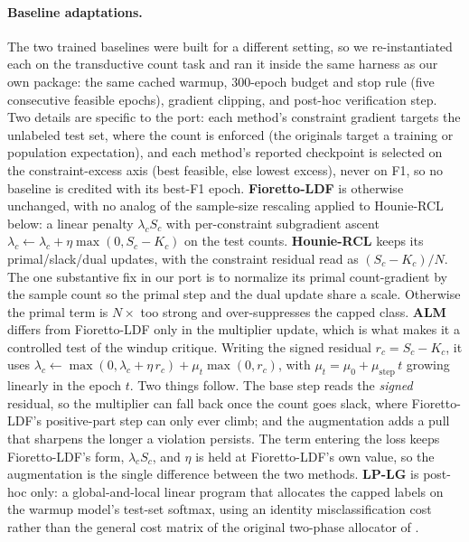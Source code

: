 \documentclass[10pt]{article}
\begin{document}
\paragraph{Baseline adaptations.}
The two trained baselines were built for a different setting, so we
re-instantiated each on the transductive count task and ran it inside the
same harness as our own package: the same cached warmup, $300$-epoch budget
and stop rule (five consecutive feasible epochs), gradient clipping, and
post-hoc verification step. Two details are specific to the port: each
method's constraint gradient targets the unlabeled test set, where the
count is enforced (the originals target a training or population
expectation), and each method's reported checkpoint is selected on the
constraint-excess axis (best feasible, else lowest excess), never on F1, so
no baseline is credited with its best-F1 epoch. \textbf{Fioretto-LDF} is
otherwise unchanged, with no analog of the sample-size rescaling applied to
Hounie-RCL below: a linear penalty $\lambda_c S_c$ with per-constraint
subgradient ascent
$\lambda_c\!\leftarrow\!\lambda_c+\eta\max(0,S_c\!-\!K_c)$ on the test
counts. \textbf{Hounie-RCL} keeps its primal/slack/dual updates, with the
constraint residual read as $(S_c\!-\!K_c)/N$. The one substantive fix in
our port is to normalize its primal count-gradient by the sample count so
the primal step and the dual update share a scale. Otherwise the primal
term is $N\times$ too strong and over-suppresses the capped class.
{\color{blue}\textbf{ALM} differs from Fioretto-LDF only in the multiplier update,
which is what makes it a controlled test of the windup critique. Writing the
signed residual $r_c\!=\!S_c\!-\!K_c$, it uses
$\lambda_c\!\leftarrow\!\max(0,\lambda_c\!+\!\eta\,r_c)+\mu_t\max(0,r_c)$, with
$\mu_t\!=\!\mu_0\!+\!\mu_{\mathrm{step}}\,t$ growing linearly in the epoch $t$.
Two things follow. The base step reads the \emph{signed} residual, so the
multiplier can fall back once the count goes slack, where Fioretto-LDF's
positive-part step can only ever climb; and the augmentation adds a pull that
sharpens the longer a violation persists. The term entering the loss keeps
Fioretto-LDF's form, $\lambda_c S_c$, and $\eta$ is held at Fioretto-LDF's own
value, so the augmentation is the single difference between the two methods.}
\textbf{LP-LG} is post-hoc only: a global-and-local linear program that
allocates the capped labels on the warmup model's test-set softmax, using
an identity misclassification cost rather than the general cost matrix
of the original two-phase allocator of
\citet{shifman2025classification}.
\end{document}
